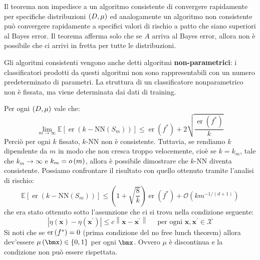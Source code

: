 \documentclass[\main/main.tex]{subfiles}
\begin{document}
\begin{multicols}{2}
\begin{observation}
    Il teorema non impedisce a un algoritmo consistente di convergere rapidamente per specifiche distribuzioni \(\left(D, \mu\right)\) ed analogamente un algoritmo non consistente può convergere rapidamente a specifici valori di rischio a patto che siano superiori al Bayes error. Il teorema afferma solo che se \(A\) arriva al Bayes error, allora non è possibile che ci arrivi in fretta per tutte le distribuzioni.
\end{observation}
\begin{definition}
    Gli algoritmi consistenti vengono anche detti algoritmi \textbf{non-parametrici}:  i classificatori prodotti da questi algoritmi non sono rappresentabili con un numero predeterminato di parametri. La struttura di un classificatore nonparametrico non è fissata, ma viene determinata dai dati di training.
\end{definition}
\begin{example}
    Per ogni \(\left(D, \mu\right)\) vale che:
    \[
        \lim _{m \rightarrow \infty} \mathbb{E}\left[\operatorname{er}\left(k-\mathrm{NN}\left(S_{m}\right)\right)\right] \leq \operatorname{er}\left(f^{*}\right)+2 \sqrt{\frac{\operatorname{er}\left(f^{*}\right)}{k}}
    \]
    Perciò per ogni \(k\) fissato, \(k\)-NN non è consistente. Tuttavia, se rendiamo \(k\) dipendente da \(m\) in modo che non cresca troppo velocemente, cioè se \(k = k_m\), tale che \(k_m \rightarrow \infty\) e \(k_m = o\left(m\right)\), allora è possibile dimostrare che \(k\)-NN diventa consistente. Possiamo confrontare il risultato con quello ottenuto tramite l'analisi di rischio:
    \[
        \mathbb{E}\left[\operatorname{er}\left(k-\mathrm{NN}\left(S_{m}\right)\right)\right] \leq\left(1+\sqrt{\frac{8}{k}}\right) \operatorname{er}\left(f^{*}\right)+\mathcal{O}\left(k m^{-1 /(d+1)}\right)
    \]
    che era stato ottenuto sotto l'assunzione che ci si trova nella condizione seguente:
    \[
        \left|\eta(\boldsymbol{x})-\eta\left(\boldsymbol{x}^{\prime}\right)\right| \leq c\left\|\boldsymbol{x}-\boldsymbol{x}^{\prime}\right\| \quad \text { per ogni } \boldsymbol{x}, \boldsymbol{x}^{\prime} \in \mathcal{X}
    \]
    Si noti che se \(\text{er}\left(f^*\right) = 0\) (prima condizione del no free lunch theorem) allora dev'essere \(\mu\rnd{\bmx} \in \crl{0,1}\) per ogni \(\bmx\). Ovvero \(\mu\) è discontinua e la condizione non può essere rispettata.
\end{example}
\begin{example}

\end{example}
\end{multicols}
\end{document}
